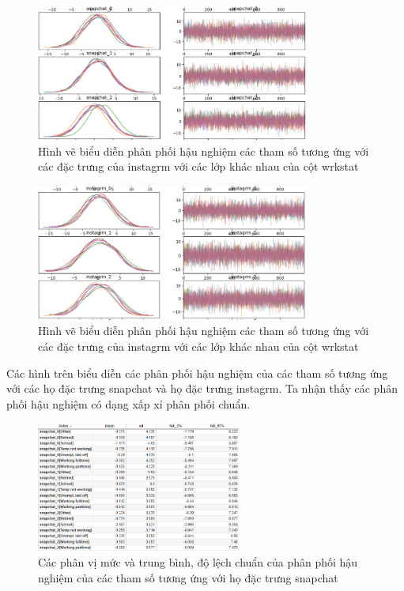 \begin{figure}[H]
    \centering
    \includegraphics[width=0.8\textwidth]{figures/Thanh/Models/Bayesian_Multi_Logit/Bayesian_email_with_null_snapchat_weights_plot.png}
    \caption{Hình vẽ biểu diễn phân phối hậu nghiệm các tham số tương ứng với các đặc trưng của instagrm với các lớp khác nhau của cột wrkstat}
    \label{fig:Bayesian_email_with_null_snapchat_weights_plot}
\end{figure}

\begin{figure}[H]
    \centering
    \includegraphics[width=0.8\textwidth]{figures/Thanh/Models/Bayesian_Multi_Logit/Bayesian_email_with_null_instagrm_weights_plot.png}
    \caption{Hình vẽ biểu diễn phân phối hậu nghiệm các tham số tương ứng với các đặc trưng của instagrm với các lớp khác nhau của cột wrkstat}
    \label{fig:Bayesian_email_with_null_instagrm_weights_plot}
\end{figure}

Các hình trên biểu diễn các phân phối hậu nghiệm của các tham số tương ứng với các họ đặc trưng snapchat và họ đặc trưng instagrm.
Ta nhận thấy các phân phối hậu nghiệm có dạng xấp xỉ phân phối chuẩn.

\begin{figure}[H]
    \centering
    \includegraphics[width=0.6\textwidth]{figures/Thanh/Models/Bayesian_Multi_Logit/Bayesian_email_with_null_snapchat_weights.png}
    \caption{Các phân vị mức và trung bình, độ lệch chuẩn của phân phối hậu nghiệm của các tham số tương ứng với họ đặc trưng snapchat}
    \label{fig:Bayesian_email_with_null_snapchat_weights}
\end{figure}


